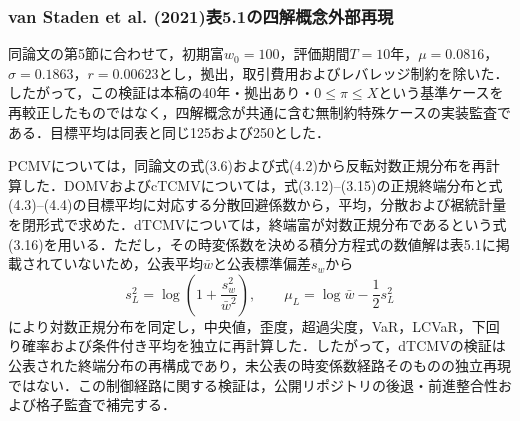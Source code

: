\documentclass[10pt,a4paper]{article}
\theoremstyle{plain}
\theoremstyle{definition}
\begin{document}
\subsubsection{van Staden et al. (2021)表5.1の四解概念外部再現}

同論文の第5節に合わせて，初期富$w_0=100$，評価期間$T=10$年，$\mu=0.0816$，$\sigma=0.1863$，$r=0.00623$とし，拠出，取引費用およびレバレッジ制約を除いた．したがって，この検証は本稿の40年・拠出あり・$0\leq\pi\leq X$という基準ケースを再較正したものではなく，四解概念が共通に含む無制約特殊ケースの実装監査である．目標平均は同表と同じ125および250とした．

PCMVについては，同論文の式(3.6)および式(4.2)から反転対数正規分布を再計算した．DOMVおよびcTCMVについては，式(3.12)--(3.15)の正規終端分布と式(4.3)--(4.4)の目標平均に対応する分散回避係数から，平均，分散および裾統計量を閉形式で求めた．dTCMVについては，終端富が対数正規分布であるという式(3.16)を用いる．ただし，その時変係数を決める積分方程式の数値解は表5.1に掲載されていないため，公表平均$\bar w$と公表標準偏差$s_w$から
\begin{equation}
 s_L^2=\log\!\left(1+\frac{s_w^2}{\bar w^2}\right),
 \qquad
 \mu_L=\log \bar w-\frac12s_L^2
 \label{eq:dtcmv-external-lognormal-identification}
\end{equation}
により対数正規分布を同定し，中央値，歪度，超過尖度，VaR，LCVaR，下回り確率および条件付き平均を独立に再計算した．したがって，dTCMVの検証は公表された終端分布の再構成であり，未公表の時変係数経路そのものの独立再現ではない．この制御経路に関する検証は，公開リポジトリの後退・前進整合性および格子監査で補完する．
\end{document}
